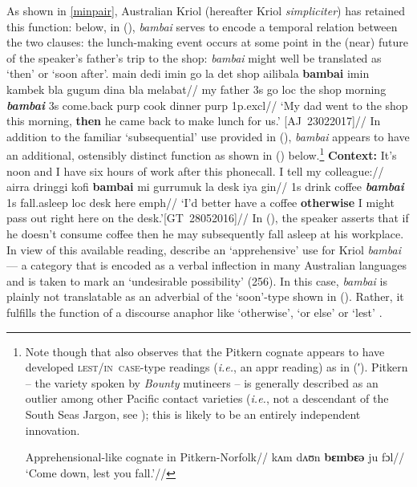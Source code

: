 As shown in \ref{minpair}, Australian Kriol (hereafter Kriol \textit{simpliciter}) has retained this function: below, in (), \textit{bambai} serves to encode a temporal relation between the two clauses: the lunch-making event occurs at some point in the (near) future of the speaker's father's trip to the shop: \textit{bambai }might well be translated as `then' or `soon after'.
\pex{}\begingl
\gla main dedi imin go la det shop ailibala \textbf{bambai} imin kambek bla gugum dina bla melabat//
\glb my father 3s go {\sc loc} the shop morning \textit{\textbf{bambai}} 3s come.back {\sc purp} cook dinner {\sc purp} 1p{\sc.excl}//
\glft`My dad went to the shop this morning, \textbf{then} he came back to make lunch for us.' \hspace*{\fill}[AJ~23022017]//
\endgl\xe
In addition to the familiar `subsequential' use provided in (), \textit{bambai} appears to have an additional, ostensibly distinct function as shown in () below.\footnote{
	Note though that \citeauthor{Clark1979} also observes that the Pitkern cognate appears to have developed \textsc{lest/in~case}-type readings (\textit{i.e.}, an \gls{appr} reading) as in (′). Pitkern -- the variety spoken by \textit{Bounty} mutineers -- is generally described as an outlier among other Pacific contact varieties (\textit{i.e.}, not a descendant of the South Seas Jargon, see \citealp[48]{Clark1979}); this is likely to be an entirely independent innovation.\label{PN footnote}

\pex[aboveglftskip=0ex,exno=\getref{app0}′]\begingl\glpreamble Apprehensional-like cognate in Pitkern-Norfolk//
\gla kʌm dʌʊn \textbf{bɛmbɛǝ} ju  fɔl//
\glft`Come down, lest you fall.'//\endgl
\xe

}
\pex[nopreamble]
\begingl
\glpreamble\textbf{Context:}  It's noon and I have six hours of work after this phonecall. I tell my colleague://
\gla ai\textdblhyphen{}rra dringgi kofi \textbf{bambai} mi gurrumuk la desk iya gin//
\glb 1s drink coffee \textit{\textbf{bambai}} 1s fall.asleep {\sc loc} desk here {\sc emph}//
\glft `I'd better have a coffee \textbf{otherwise} I might pass out right here on the desk.'\hfill[GT~28052016]//
\endgl
\xe
In (), the speaker asserts that if he doesn't consume coffee then he may subsequently fall asleep at his workplace. In view of this available reading, \citet{Angelo2016} describe an `apprehensive' use for Kriol \textit{bambai} --- a category that is encoded as a verbal inflection in many Australian languages and is taken to mark an `undesirable possibility' (256). In this case, \textit{bambai} is plainly not translatable as an adverbial of the `soon'-type shown in (). Rather, it fulfills the function of a discourse anaphor like `otherwise', `or else' or `lest' \citep[see also][]{Webber2001,PhilKotek}.

